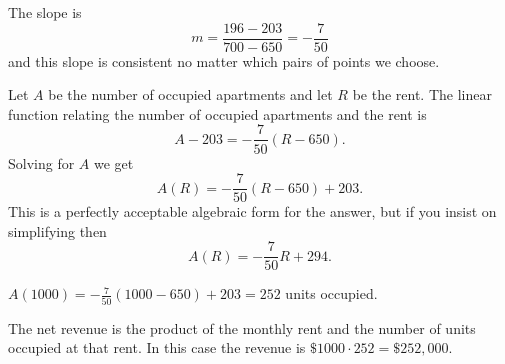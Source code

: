 \begin{activitySolution}
   \ba
        \item The slope is 
            \[ m = \frac{196-203}{700-650} = -\frac{7}{50} \]
            and this slope is consistent no matter which pairs of points we choose.
        \item Let $A$ be the number of occupied apartments and let $R$ be the rent.  The
            linear function relating the number of occupied apartments and the rent is
            \[ A - 203 = -\frac{7}{50} \left( R - 650 \right). \]
            Solving for $A$ we get
            \[ A(R) = -\frac{7}{50} \left( R - 650 \right) + 203. \]
            This is a perfectly acceptable algebraic form for the answer, but if you
            insist on simplifying then
            \[ A(R) = -\frac{7}{50} R + 294. \]
        \item $A(1000) = -\frac{7}{50} \left( 1000 - 650 \right) + 203 = 252$ units
            occupied.
        \item The net revenue is the product of the monthly rent and the number of units
            occupied at that rent.  In this case the revenue is $\$1000 \cdot 252 =
            \$252,000$.
   \ea
\end{activitySolution}
\aftera
